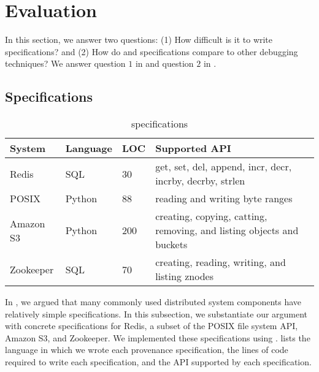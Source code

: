\section{Evaluation}

In this section, we answer two questions: (1) How difficult is it to write
\watprovenance{} specifications? and (2) How do \watprovenance{} and
\watprovenance{} specifications compare to other debugging techniques?
We answer question $1$ in  and question $2$ in
.

\subsection{\WatProvenance{} Specifications}
\begin{table*}[t]
  \caption{\fluent{} \watprovenance{} specifications}
  \begin{tabular}{llll}
    \toprule
    System    & Language & LOC & Supported API                                                         \\\midrule
    Redis     & SQL      & 30  & get, set, del, append, incr, decr, incrby, decrby, strlen             \\
    POSIX     & Python   & 88  & reading and writing byte ranges                                       \\
    Amazon S3 & Python   & 200 & creating, copying, catting, removing, and listing objects and buckets \\
    Zookeeper & SQL      & 70  & creating, reading, writing, and listing znodes                        \\
    \bottomrule
  \end{tabular}
\end{table*}

In , we argued that many commonly used distributed system
components have relatively simple \watprovenance{} specifications. In this
subsection, we substantiate our argument with concrete \watprovenance{}
specifications for Redis, a subset of the POSIX file system API, Amazon S3, and
Zookeeper.
%
We implemented these \watprovenance{} specifications using \fluent{}.
 lists the language in which we wrote each provenance
specification, the lines of code required to write each specification, and the
API supported by each specification.

